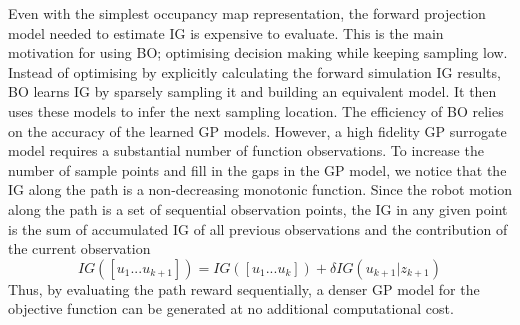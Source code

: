 \documentclass[shortAfour,sageh,times]{sagej_no_sage}
\begin{document}
	Even with the simplest occupancy map representation, the forward projection model needed to estimate IG is expensive to evaluate. This is the main motivation for using BO; optimising decision making while keeping sampling low. Instead of optimising by explicitly calculating the forward simulation IG results, BO learns IG by sparsely sampling it and building an equivalent model. It then uses these models to infer the next sampling location. The efficiency of BO relies on the accuracy of the learned GP models. However, a high fidelity GP surrogate model requires a substantial number of function observations. To increase the number of sample points and fill in the gaps in the GP model, we notice that the IG along the path is a non-decreasing monotonic function. Since the robot motion along the path is a set of sequential observation points, the IG in any given point is the sum of accumulated IG of all previous observations and the contribution of the current observation
	\begin{equation*}
		IG([u_1...u_{k+1}]) = IG([u_1...u_{k}])+\delta IG(u_{k+1} | z_{k+1})
	\end{equation*}
	Thus, by evaluating the path reward sequentially, a denser GP model for the objective function can be generated at no additional computational cost.
\end{document}
